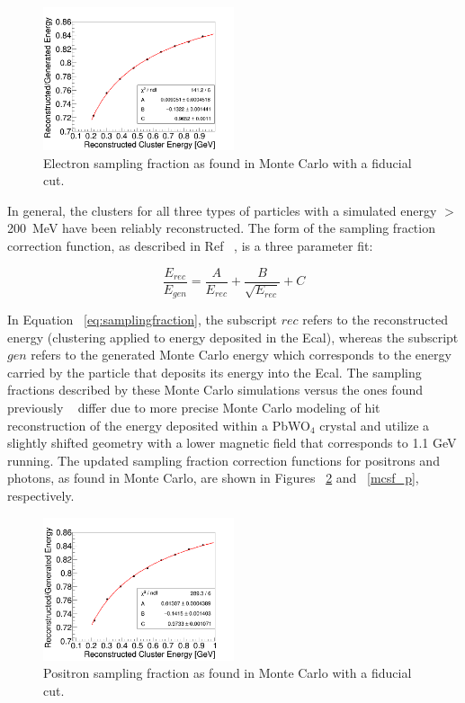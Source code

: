 \documentclass[twoside]{article}
\begin{document}
\begin{multicols}{2}
\begin{figure}[H]
  \centering
      \includegraphics[width=0.5\textwidth]{pics/fidSF_em.png}
  \caption{Electron sampling fraction as found in Monte Carlo with a fiducial cut.}
  \label{mcsf_em}
\end{figure}	

In general, the clusters for all three types of particles with a simulated energy $>$ 200~MeV have been reliably reconstructed. The form of the sampling fraction correction function, as described in Ref ~\cite{Garcon}, is a three parameter fit:

\begin{equation}
\label{eq:samplingfraction}
\dfrac{E_{rec}}{E_{gen}} = \dfrac{A}{E_{rec}}+\dfrac{B}{\sqrt{E_{rec}}}+C 
\end{equation}	

In Equation ~\ref{eq:samplingfraction}, the subscript $rec$ refers to the reconstructed energy (clustering applied to energy deposited in the Ecal), whereas the subscript $gen$ refers to the generated Monte Carlo energy which corresponds to the energy carried by the particle that deposits its energy into the Ecal. The sampling fractions described by these Monte Carlo simulations versus the ones found previously ~\cite{Garcon} differ due to more precise Monte Carlo modeling of hit reconstruction of the energy deposited within a PbWO$_4$ crystal and utilize a slightly shifted geometry with a lower magnetic field that corresponds to 1.1 GeV running. The updated sampling fraction correction functions for positrons and photons, as found in Monte Carlo, are shown in Figures ~\ref{mcsf_ep} and ~\ref{mcsf_p}, respectively.   
 
\begin{figure}[H]
  \centering
      \includegraphics[width=0.5\textwidth]{pics/fidSF_ep.png}
  \caption{Positron sampling fraction as found in Monte Carlo with a fiducial cut.}
  \label{mcsf_ep}
\end{figure}



\end{multicols}
\end{document}
